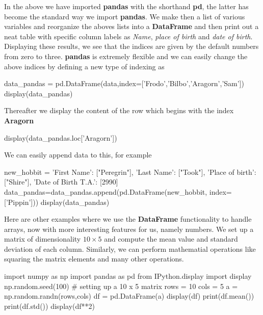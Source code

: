 \documentclass[%
oneside,                 %
final,                   %
10pt]{article}
\begin{document}
\epycod


In the above we have imported \textbf{pandas} with the shorthand \textbf{pd}, the latter has become the standard way we import \textbf{pandas}. We make then a list of various variables
and reorganize the aboves lists into a \textbf{DataFrame} and then print out  a neat table with specific column labels as \emph{Name}, \emph{place of birth} and \emph{date of birth}.
Displaying these results, we see that the indices are given by the default numbers from zero to three.
\textbf{pandas} is extremely flexible and we can easily change the above indices by defining a new type of indexing as



\bpycod
data_pandas = pd.DataFrame(data,index=['Frodo','Bilbo','Aragorn','Sam'])
display(data_pandas)

\epycod

Thereafter we display the content of the row which begins with the index \textbf{Aragorn}


\bpycod
display(data_pandas.loc['Aragorn'])

\epycod


We can easily append data to this, for example








\bpycod
new_hobbit = {'First Name': ["Peregrin"],
              'Last Name': ["Took"],
              'Place of birth': ["Shire"],
              'Date of Birth T.A.': [2990]
              }
data_pandas=data_pandas.append(pd.DataFrame(new_hobbit, index=['Pippin']))
display(data_pandas)

\epycod


Here are other examples where we use the \textbf{DataFrame} functionality to handle arrays, now with more interesting features for us, namely numbers. We set up a matrix 
of dimensionality $10\times 5$ and compute the mean value and standard deviation of each column. Similarly, we can perform mathematial operations like squaring the matrix elements and many other operations. 














\bpycod
import numpy as np
import pandas as pd
from IPython.display import display
np.random.seed(100)
# setting up a 10 x 5 matrix
rows = 10
cols = 5
a = np.random.randn(rows,cols)
df = pd.DataFrame(a)
display(df)
print(df.mean())
print(df.std())
display(df**2)
\end{document}
